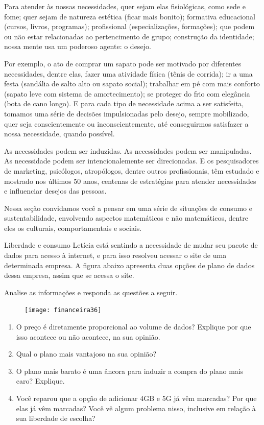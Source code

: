 
Para atender às nossas necessidades, quer sejam elas fisiológicas, como sede e fome; quer sejam de natureza estética (ficar mais bonito); formativa educacional (cursos, livros, programas); profissional (especializações, formações); que podem ou não estar relacionadas ao pertencimento de grupo; construção da identidade; nossa mente usa um poderoso agente: o desejo.

Por exemplo, o ato de comprar um sapato pode ser motivado por diferentes necessidades, dentre elas, fazer uma atividade física (tênis de corrida); ir a uma festa (sandália de salto alto ou sapato social); trabalhar em pé com mais conforto (sapato leve com sistema de amortecimento); se proteger do frio com elegância (bota de cano longo). E para cada tipo de necessidade acima a ser satisfeita, tomamos uma série de decisões impulsionadas pelo desejo, sempre mobilizado, quer seja conscientemente ou inconscientemente, até conseguirmos satisfazer a nossa necessidade, quando possível.

As necessidades podem ser induzidas. As necessidades podem ser manipuladas. As necessidade podem ser intencionalemente ser direcionadas. E os pesquisadores de marketing, psicólogos, atropólogos, dentre outros profissionais, têm estudado e mostrado nos últimos 50 anos, centenas de estratégias para atender necessidades e influenciar desejos das pessoas.

Nessa seção convidamos você a pensar em uma série de situações de consumo e sustentabilidade, envolvendo aspectos matemáticos e não matemáticos, dentre eles os culturais, comportamentais e sociais.

\begin{task}{Liberdade e consumo}
Letícia está sentindo a necessidade de mudar seu pacote de dados para acesso à internet, e para isso resolveu acessar o site de uma determinada empresa. A figura abaixo apresenta duas opções de plano de dados dessa empresa, assim que se acessa o site.

Analise as informações e responda as questões a seguir.

\begin{figure}[H]
\centering

\texttt{[image: financeira36]}
\end{figure}

\begin{enumerate}
  \item O preço é diretamente proporcional ao volume de dados? Explique por que isso acontece ou não acontece, na sua opinião.
  \item Qual o plano mais vantajoso na sua opinião?
  \item O plano mais barato é uma âncora para induzir a compra do plano mais caro? Explique.
  \item Você reparou que a opção de adicionar 4GB e 5G já vêm marcadas? Por que elas já vêm marcadas? Você vê algum problema nisso, inclusive em relação à sua liberdade de escolha?
\end{enumerate}
\end{task}

